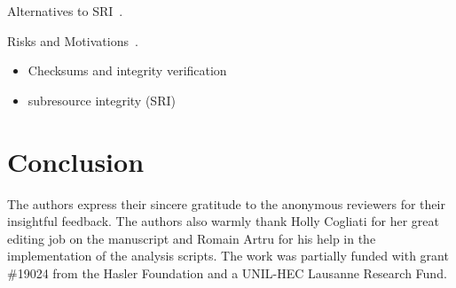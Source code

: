 \documentclass[sigconf,table]{acmart}
\begin{document}
Alternatives to SRI~\cite{matulevicius_ensuring_2018,calzavara_content_2016,kumar_security_2017,salvador_wraudit_2018}.

Risks and Motivations~\cite{bodden_control_2017,romagna_hacktivism_2017,kerschbaumer_enforcing_2016,lavrenovs_http_2018,arshad_large-scale_2018,eden_major_2018,van_acker_measuring_2017}.

\begin{itemize}
	\item Checksums and integrity verification
	\item subresource integrity (SRI)	
\end{itemize}


\section{Conclusion} \label{sec:conclusion}

\begin{acks}
The authors express their sincere gratitude to the anonymous reviewers for their insightful feedback. The authors also warmly thank Holly Cogliati for her great editing job on the manuscript and Romain Artru for his help in the implementation of the analysis scripts. The work was partially funded with grant \#19024 from the Hasler Foundation and  a UNIL-HEC Lausanne Research Fund.
\end{acks}

\balance



\appendix
\end{document}
